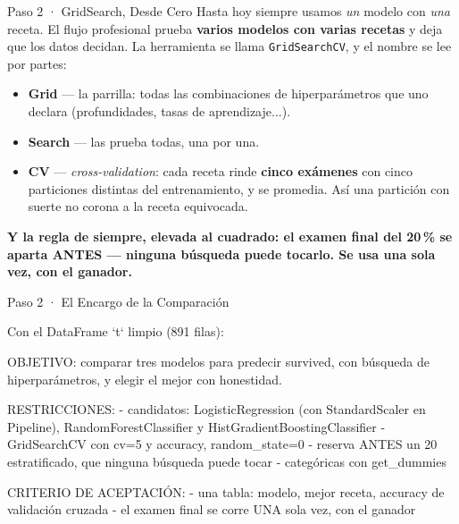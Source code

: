 \documentclass[aspectratio=169, 11pt]{beamer}
\begin{document}
\begin{frame}[shrink=5]{Paso 2 · GridSearch, Desde Cero}
  \vspace{2pt}
  {\footnotesize\color{textMuted
   }Hasta hoy siempre usamos \emph{un} modelo con \emph{una} receta. El flujo
   profesional prueba \textbf{varios modelos con varias recetas} y deja que
   los datos decidan. La herramienta se llama \texttt{GridSearchCV}, y el
   nombre se lee por partes:}
  \vspace{6pt}
  {\footnotesize\color{textMuted}
  \begin{itemize}\setlength{\itemsep}{5pt}
    \item[{\color{arcaRed}\scriptsize\faTh}]
      \textbf{Grid} --- la parrilla: todas las combinaciones de
      hiperparámetros que uno declara (profundidades, tasas de aprendizaje...).
    \item[{\color{arcaRed}\scriptsize\faSearch}]
      \textbf{Search} --- las prueba todas, una por una.
    \item[{\color{arcaRed}\scriptsize\faSyncAlt}]
      \textbf{CV} --- \emph{cross-validation}: cada receta rinde
      \textbf{cinco exámenes} con cinco particiones distintas del
      entrenamiento, y se promedia. Así una partición con suerte no corona a
      la receta equivocada.
  \end{itemize}}
  \vspace{6pt}
  {\footnotesize\color{arcaDark}\bfseries
   Y la regla de siempre, elevada al cuadrado: el examen final del 20\,\% se
   aparta ANTES --- ninguna búsqueda puede tocarlo. Se usa una sola vez, con
   el ganador.}
\end{frame}

\begin{frame}[shrink=5]{Paso 2 · El Encargo de la Comparación}
  \vspace{2pt}
  \begin{prompt}
Con el DataFrame `t` limpio (891 filas):

OBJETIVO: comparar tres modelos para predecir
survived, con búsqueda de hiperparámetros, y elegir
el mejor con honestidad.

RESTRICCIONES:
- candidatos: LogisticRegression (con StandardScaler
  en Pipeline), RandomForestClassifier y
  HistGradientBoostingClassifier
- GridSearchCV con cv=5 y accuracy, random_state=0
- reserva ANTES un 20%
  estratificado, que ninguna búsqueda puede tocar
- categóricas con get_dummies

CRITERIO DE ACEPTACIÓN:
- una tabla: modelo, mejor receta, accuracy de
  validación cruzada
- el examen final se corre UNA sola vez, con el
  ganador
  \end{prompt}
\end{frame}
\end{document}
